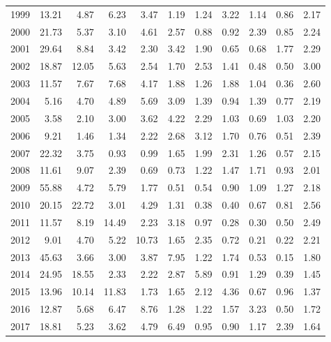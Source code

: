 \documentclass[]{article}
\begin{document}
\begin{table}[ht]
\begin{tabular}{rrrrrrrrrrr}
  1999 & 13.21 & 4.87 & 6.23 & 3.47 & 1.19 & 1.24 & 3.22 & 1.14 & 0.86 & 2.17 \\ 
  2000 & 21.73 & 5.37 & 3.10 & 4.61 & 2.57 & 0.88 & 0.92 & 2.39 & 0.85 & 2.24 \\ 
  2001 & 29.64 & 8.84 & 3.42 & 2.30 & 3.42 & 1.90 & 0.65 & 0.68 & 1.77 & 2.29 \\ 
  2002 & 18.87 & 12.05 & 5.63 & 2.54 & 1.70 & 2.53 & 1.41 & 0.48 & 0.50 & 3.00 \\ 
  2003 & 11.57 & 7.67 & 7.68 & 4.17 & 1.88 & 1.26 & 1.88 & 1.04 & 0.36 & 2.60 \\ 
  2004 & 5.16 & 4.70 & 4.89 & 5.69 & 3.09 & 1.39 & 0.94 & 1.39 & 0.77 & 2.19 \\ 
  2005 & 3.58 & 2.10 & 3.00 & 3.62 & 4.22 & 2.29 & 1.03 & 0.69 & 1.03 & 2.20 \\ 
  2006 & 9.21 & 1.46 & 1.34 & 2.22 & 2.68 & 3.12 & 1.70 & 0.76 & 0.51 & 2.39 \\ 
  2007 & 22.32 & 3.75 & 0.93 & 0.99 & 1.65 & 1.99 & 2.31 & 1.26 & 0.57 & 2.15 \\ 
  2008 & 11.61 & 9.07 & 2.39 & 0.69 & 0.73 & 1.22 & 1.47 & 1.71 & 0.93 & 2.01 \\ 
  2009 & 55.88 & 4.72 & 5.79 & 1.77 & 0.51 & 0.54 & 0.90 & 1.09 & 1.27 & 2.18 \\ 
  2010 & 20.15 & 22.72 & 3.01 & 4.29 & 1.31 & 0.38 & 0.40 & 0.67 & 0.81 & 2.56 \\ 
  2011 & 11.57 & 8.19 & 14.49 & 2.23 & 3.18 & 0.97 & 0.28 & 0.30 & 0.50 & 2.49 \\ 
  2012 & 9.01 & 4.70 & 5.22 & 10.73 & 1.65 & 2.35 & 0.72 & 0.21 & 0.22 & 2.21 \\ 
  2013 & 45.63 & 3.66 & 3.00 & 3.87 & 7.95 & 1.22 & 1.74 & 0.53 & 0.15 & 1.80 \\ 
  2014 & 24.95 & 18.55 & 2.33 & 2.22 & 2.87 & 5.89 & 0.91 & 1.29 & 0.39 & 1.45 \\ 
  2015 & 13.96 & 10.14 & 11.83 & 1.73 & 1.65 & 2.12 & 4.36 & 0.67 & 0.96 & 1.37 \\ 
  2016 & 12.87 & 5.68 & 6.47 & 8.76 & 1.28 & 1.22 & 1.57 & 3.23 & 0.50 & 1.72 \\ 
  2017 & 18.81 & 5.23 & 3.62 & 4.79 & 6.49 & 0.95 & 0.90 & 1.17 & 2.39 & 1.64 \\ 
   \hline
\end{tabular}
\end{table}
\end{document}
